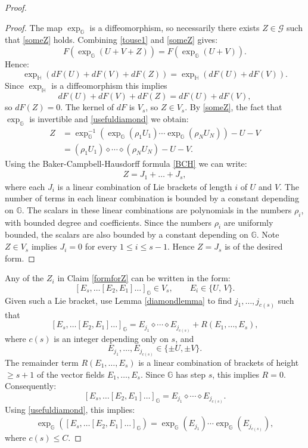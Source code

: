 \documentclass[reqno, 11pt]{amsart}
\theoremstyle{definition}
\theoremstyle{remark}
\numberwithin{theorem}{section}
\numberwithin{equation}{section}
\begin{document}
\begin{proof}
\begin{proof}
The map $\exp_{\mathbb{G}}$ is a diffeomorphism, so necessarily there exists $Z\in \mathcal{G}$ such that \eqref{someZ} holds. Combining \eqref{touse1} and \eqref{someZ} gives:
\[ F(\exp_{\mathbb{G}}(U+V+Z))= F(\exp_{\mathbb{G}}(U+V)).\]
Hence:
\[ \exp_{\mathbb{H}} (dF(U)+dF(V)+dF(Z))= \exp_{\mathbb{H}} (dF(U)+dF(V)).\]
Since $\exp_{\mathbb{H}}$ is a diffeomorphism this implies 
\[ dF(U)+dF(V)+dF(Z) = dF(U)+dF(V),\]
so $dF(Z)=0$. The kernel of $dF$ is $V_{s}$, so $Z\in V_{s}$. 
By \eqref{someZ}, the fact that $\exp_{\mathbb{G}}$ is invertible and \eqref{usefuldiamond} we obtain:
\begin{align}
Z&=\exp_{\mathbb{G}}^{-1}(\exp_{\mathbb{G}}(\rho_{1}U_1)\cdots \exp_{\mathbb{G}}(\rho_{N}U_N))-U-V\\
\nonumber
&=(\rho_1 U_1) \diamond \cdots \diamond (\rho_N U_N) - U - V.
\end{align}
Using the Baker-Campbell-Hausdorff formula \eqref{BCH} we can write:
\begin{align}
Z=J_{1}+\ldots+J_{s},
\end{align}
where each $J_i$ is a linear combination of Lie brackets of length $i$ of $U$ and $V$. The number of terms in each linear combination is bounded by a constant depending on $\mathbb{G}$. The scalars in these linear combinations are polynomials in the numbers $\rho_i$, with bounded degree and coefficients. Since the numbers $\rho_{i}$ are uniformly bounded, the scalars are also bounded by a constant depending on $\mathbb{G}$. Note $Z\in V_{s}$ implies $J_i=0$ for every $1\leq i\leq s-1$. Hence $Z=J_{s}$ is of the desired form.
\end{proof}

Any of the $Z_{i}$ in Claim \ref{formforZ} can be written in the form:
\begin{equation}\label{formstoadd} [E_{s}, \ldots [E_{2}, E_{1}]\ldots]_{\mathbb{G}} \in V_{s}, \qquad E_{i} \in \{ U, \, V\}.\end{equation}
Given such a Lie bracket, use Lemma \ref{diamondlemma} to find $j_{1}, \ldots, j_{c(s)}$ such that
\[ [E_{s}, \ldots [E_{2}, E_{1}]\ldots]_{\mathbb{G}} = E_{j_{1}}\diamond \cdots \diamond E_{j_{c(s)}}+R(E_{1}, \ldots, E_{s}),\]
where $c(s)$ is an integer depending only on $s$, and
\[E_{j_{1}}, \ldots, E_{j_{c(s)}} \in \{ \pm U, \pm V \}.\]
The remainder term $R(E_{1}, \ldots, E_{s})$ is a linear combination of brackets of height $\geq s+1$ of the vector fields $E_{1}, \ldots, E_{s}$. Since $\mathbb{G}$ has step $s$, this implies $R=0$. Consequently:
\[ [E_{s}, \ldots [E_{2}, E_{1}]\ldots]_{\mathbb{G}} = E_{j_{1}}\diamond \cdots \diamond E_{j_{c(s)}}.\]
Using \eqref{usefuldiamond}, this implies:
\begin{equation}\label{onebracketgood} \exp_{\mathbb{G}}([E_{s}, \ldots [E_{2}, E_{1}]\ldots]_{\mathbb{G}} ) = \exp_{\mathbb{G}}(E_{j_{1}}) \cdots \exp_{\mathbb{G}}(E_{j_{c(s)}}),\end{equation}
where $c(s)\leq C$. 


\end{proof}
\end{document}
